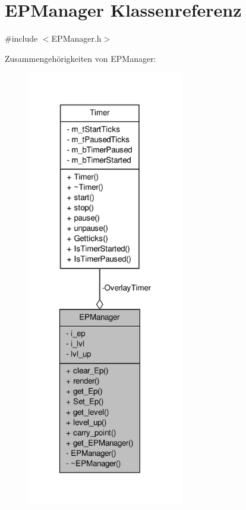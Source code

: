 \hypertarget{class_e_p_manager}{\section{E\-P\-Manager Klassenreferenz}
\label{class_e_p_manager}
}


{\ttfamily \#include $<$E\-P\-Manager.\-h$>$}



Zusammengehörigkeiten von E\-P\-Manager\-:
\nopagebreak
\begin{figure}[H]
\begin{center}
\leavevmode
\includegraphics[width=195pt]{class_e_p_manager__coll__graph}
\end{center}
\end{figure}

